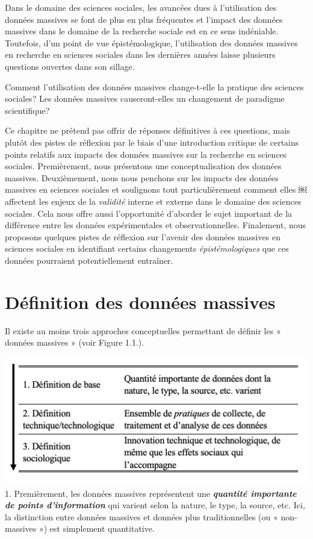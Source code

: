 \documentclass[
  letterpaper,
  DIV=11,
  numbers=noendperiod]{scrreprt}
\begin{document}
Dans le domaine des sciences sociales, les avancées dues à l'utilisation
des données massives se font de plus en plus fréquentes et l'impact des
données massives dans le domaine de la recherche sociale est en ce sens
indéniable. Toutefois, d'un point de vue épistémologique, l'utilisation
des données massives en recherche en sciences sociales dans les
dernières années laisse plusieurs questions ouvertes dans son sillage.

Comment l'utilisation des données massives change-t-elle la pratique des
sciences sociales? Les données massives causeront-elles un changement de
paradigme scientifique?

Ce chapitre ne prétend pas offrir de réponses définitives à ces
questions, mais plutôt des pistes de réflexion par le biais d'une
introduction critique de certains points relatifs aux impacts des
données massives sur la recherche en sciences sociales. Premièrement,
nous présentons une conceptualisation des données massives.
Deuxièmement, nous nous penchons sur les impacts des données massives en
sciences sociales et soulignons tout particulièrement comment elles ￼
affectent les enjeux de la \emph{validité} interne et externe dans le
domaine des sciences sociales. Cela nous offre aussi l'opportunité
d'aborder le sujet important de la différence entre les données
expérimentales et observationnelles. Finalement, nous proposons quelques
pistes de réflexion sur l'avenir des données massives en sciences
sociales en identifiant certains changements \emph{épistémologiques} que
ces données pourraient potentiellement entraîner.

\section*{Définition des données
massives}\label{duxe9finition-des-donnuxe9es-massives}


Il existe au moins trois approches conceptuelles permettant de définir
les « données massives » (voir Figure 1.1.).

\includegraphics{images/chapitre1_definitions.png} 1. Premièrement, les
données massives représentent une \textbf{\emph{quantité importante de
points d'information}} qui varient selon la nature, le type, la source,
etc. Ici, la distinction entre données massives et données plus
traditionnelles (ou « non-massives ») est simplement quantitative.
\end{document}
